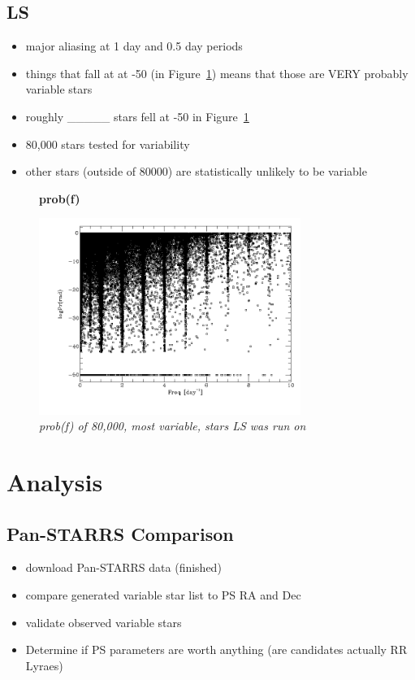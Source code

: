\documentclass[aps,prl,twocolumn,superscriptaddress]{revtex4-1}
\begin{document}
\subsection{LS}

\begin{itemize}
 \item{} major aliasing at 1 day and 0.5 day periods
 \item{} things that fall at at -50 (in Figure~\ref{fig:quartiles}) means that those are VERY probably variable stars
 \item{} roughly \_\_\_\_\_ stars fell at -50 in Figure~\ref{fig:quartiles}
 \item{} 80,000 stars tested for variability
 \item{} other stars (outside of 80000) are statistically unlikely to be variable
\end{itemize}

\begin{figure}[H]
 \centering
 \textbf{prob(f)}\par\medskip
 	\includegraphics[width=3.35in]{figures/fromJT/probf.png}
 \caption{\it \small{prob(f) of 80,000, most variable, stars LS was run on}}
 \label{fig:quartiles}
\end{figure}




\section{Analysis}

\subsection{Pan-STARRS Comparison}
\begin{itemize}
	\item{} download Pan-STARRS data (finished)
	\item{} compare generated variable star list to PS RA and Dec
	\item{} validate observed variable stars
	\item{} Determine if PS parameters are worth anything (are candidates actually RR Lyraes)
\end{itemize}
\end{document}
